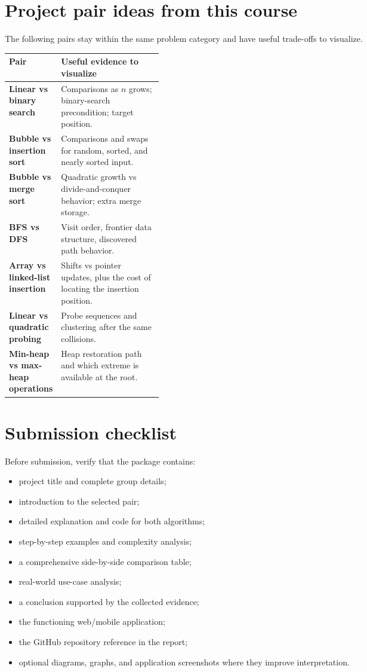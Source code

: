 \section{Project pair ideas from this course}

The following pairs stay within the same problem category and have useful trade-offs to visualize.

\begin{mltable}
\begin{tabularx}{\linewidth}{@{}>{\bfseries\leavevmode\color{ADSNavy}}p{0.30\linewidth}X@{}}
\toprule
\rowcolor{ADSPaleBlue!92}
Pair & Useful evidence to visualize \\
\midrule
Linear vs binary search & Comparisons as $n$ grows; binary-search precondition; target position. \\
Bubble vs insertion sort & Comparisons and swaps for random, sorted, and nearly sorted input. \\
Bubble vs merge sort & Quadratic growth vs divide-and-conquer behavior; extra merge storage. \\
BFS vs DFS & Visit order, frontier data structure, discovered path behavior. \\
Array vs linked-list insertion & Shifts vs pointer updates, plus the cost of locating the insertion position. \\
Linear vs quadratic probing & Probe sequences and clustering after the same collisions. \\
Min-heap vs max-heap operations & Heap restoration path and which extreme is available at the root. \\
\bottomrule
\end{tabularx}
\end{mltable}

\section{Submission checklist}

\begin{verification}
Before submission, verify that the package contains:
\begin{itemize}
  \item project title and complete group details;
  \item introduction to the selected pair;
  \item detailed explanation and code for both algorithms;
  \item step-by-step examples and complexity analysis;
  \item a comprehensive side-by-side comparison table;
  \item real-world use-case analysis;
  \item a conclusion supported by the collected evidence;
  \item the functioning web/mobile application;
  \item the GitHub repository reference in the report;
  \item optional diagrams, graphs, and application screenshots where they improve interpretation.
\end{itemize}
\end{verification}

